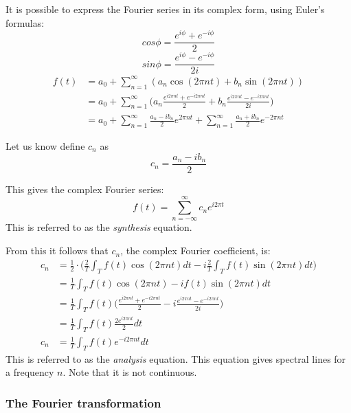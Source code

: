 \documentclass{article}
\begin{document}
It is possible to express the Fourier series in its complex form, using 
Euler's formulas:
$$cos \phi = \frac{e^{i\phi} + e^{-i\phi}}{2}$$
$$sin \phi = \frac{e^{i\phi} - e^{-i\phi}}{2i}$$
\begin{equation*}
	\begin{aligned}
		f(t) &=
		a_0 + \sum^{\infty}_{n=1}(a_n \cos(2 \pi n t) + b_n \sin(2 \pi n t)) \\
		& = a_0 + \sum^{\infty}_{n=1}\Big(
		a_n \frac{e^{i 2 \pi n t} + e^{-i 2 \pi n t}}{2} + 
		b_n \frac{e^{i 2 \pi n t} - e^{-i 2 \pi n t}}{2i}\Big) \\
		&= a_0 + \sum^{\infty}_{n=1} \frac{a_n - ib_n}{2}e^{2 \pi n t} +
		\sum^{\infty}_{n=1} \frac{a_n + ib_n}{2} e^{-2 \pi n t}
	\end{aligned}
\end{equation*}

Let us know define $c_n$ as 
$$c_n = \frac{a_n - i b_n}{2}$$

This gives the complex Fourier series:
\begin{equation*}
	f(t) = \sum^{\infty}_{n = - \infty} c_n e^{i 2 \pi t}
\end{equation*}
This is referred to as the \textit{synthesis} equation.

From this it follows that $c_n$, the complex Fourier coefficient, is:
\begin{equation*}
	\begin{aligned}
		c_n &= 
		\frac{1}{2} \cdot \bigg( \frac{2}{T} \int_T f(t) \cos(2 \pi n t) dt - 
		i \frac{2}{T} \int_T f(t) \sin(2 \pi n t) dt \bigg) \\
		&= \frac{1}{T} \int_T f(t) \cos(2 \pi n t) - i f(t) \sin(2 \pi n t) dt \\
		&= \frac{1}{T} \int_T f(t) \bigg( 
			\frac{e^{i 2 \pi n t} + e^{-i 2 \pi n t}}{2} - 
		i \frac{e^{i 2 \pi n t} - e^{-i 2 \pi n t}}{2i} \bigg) \\
		&= \frac{1}{T} \int_T f(t) \frac{2 e^{i 2 \pi n t}}{2} dt \\
		c_n &= \frac{1}{T} \int_T f(t) e^{-i 2 \pi n t} dt
	\end{aligned}
\end{equation*}
This is referred to as the \textit{analysis} equation. This equation gives 
spectral lines for a frequency $n$. Note that it is not continuous.

\subsubsection{The Fourier transformation}
\end{document}
